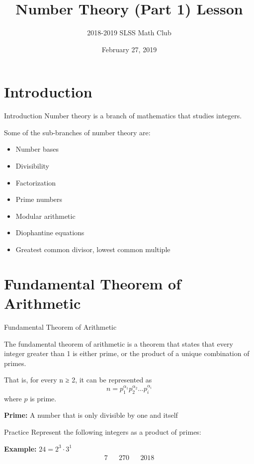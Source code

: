 \documentclass{beamer}
\title{Number Theory (Part 1) Lesson}
\author{2018-2019 SLSS Math Club}
\date{February 27, 2019}
\begin{document}
\frame{\titlepage}

\section{Introduction}
\begin{frame}{Introduction}
     Number theory is a branch of mathematics that studies integers. \newline

    Some of the sub-branches of number theory are:
    \begin{itemize}
        \item Number bases
        \item Divisibility
        \item Factorization 
        \item Prime numbers 
        \item Modular arithmetic
        \item Diophantine equations
        \item Greatest common divisor, lowest common multiple
    \end{itemize}
\end{frame}

\section{Fundamental Theorem of Arithmetic}
\begin{frame}{Fundamental Theorem of Arithmetic}
    
    The fundamental theorem of arithmetic is a theorem that states that every integer greater than 1 is either prime, or the product of a unique combination of primes. \newline
    
    That is, for every n ≥ 2, it can be represented as $$n = p_1^{\alpha_1}p_2^{\alpha_2}\dots p_i^{\alpha_i}$$ where $p$ is prime. \newline
    
    \textbf{Prime:} A number that is only divisible by one and itself
\end{frame}

\begin{frame}{Practice}
    Represent the following integers as a product of primes: \newline
    
    \textbf{Example:} $24 = 2^3 \cdot 3^1$
    \begin{align*}
        7 && 270 && 2018
    \end{align*}
    
    \vspace{8em}
\end{frame}
\end{document}
